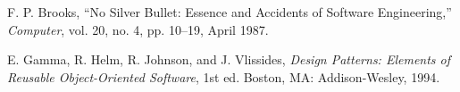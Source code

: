 \documentclass[11pt]{article}
\begin{document}
\begin{thebibliography}{99}

F. P. Brooks, ``No Silver Bullet: Essence and Accidents of Software Engineering,'' 
\emph{Computer}, vol. 20, no. 4, pp. 10--19, April 1987.

E. Gamma, R. Helm, R. Johnson, and J. Vlissides, 
\emph{Design Patterns: Elements of Reusable Object-Oriented Software}, 1st ed. 
Boston, MA: Addison-Wesley, 1994.

\end{thebibliography}

\end{document}
